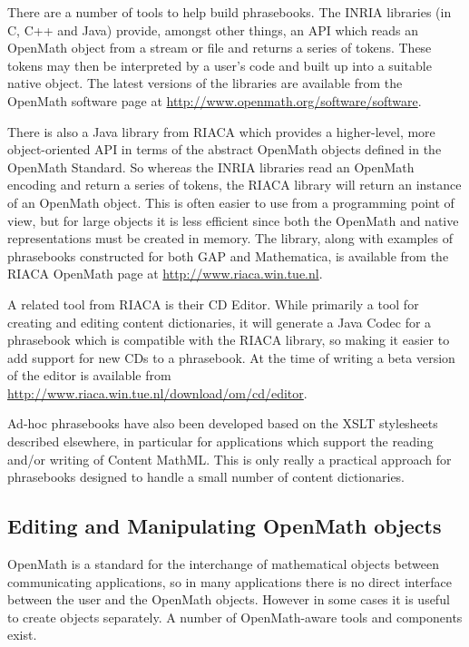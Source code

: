 \documentclass[keylogo]{openmath}
\begin{document}
There are a number of tools to help build phrasebooks.  The INRIA
libraries (in C, C++ and Java) provide, amongst other things, an API
which reads an OpenMath object from a stream or file and returns a
series of tokens.  These tokens may then be interpreted by a user's
code and built up into a suitable native object.  The latest versions
of the libraries are available from the OpenMath software page at
\url{http://www.openmath.org/software/software}.

There is also a Java library from RIACA which provides a higher-level,
more object-oriented API in terms of the abstract OpenMath objects
defined in the OpenMath Standard.  So whereas the INRIA libraries read
an OpenMath encoding and return a series of tokens, the RIACA library
will return an instance of an OpenMath object.  This is often easier to
use from a programming point of view, but for large objects it is less
efficient since both the OpenMath and native representations must be
created in memory.  The library, along with examples of phrasebooks
constructed for both GAP and Mathematica, is available from the RIACA
OpenMath page at \url{http://www.riaca.win.tue.nl}.

A related tool from RIACA is their CD Editor.  While primarily a tool
for creating and editing content dictionaries, it will generate a Java
Codec for a phrasebook which is compatible with the RIACA library, so
making it easier to add support for new CDs to a phrasebook.  At the
time of writing a beta version of the editor is available from
\url{http://www.riaca.win.tue.nl/download/om/cd/editor}.

Ad-hoc phrasebooks have also been developed based on the XSLT
stylesheets described elsewhere, in particular for applications which
support the reading and/or writing of Content MathML.  This is only
really a practical approach for phrasebooks designed to handle a small
number of content dictionaries.

\subsection {Editing and Manipulating OpenMath objects}\label{editing}

OpenMath is a standard for the interchange of mathematical objects
between communicating applications, so in many applications there is
no direct interface between the user and the OpenMath objects.
However in some cases it is useful to create objects separately.
A number of OpenMath-aware tools and components exist.
\end{document}
